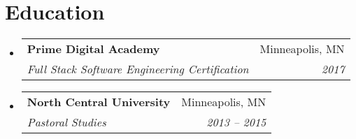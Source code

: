 \documentclass[letterpaper,12pt]{article}
\makeatletter
\newcommand{\resumeSubheading}[4]{
  \vspace{-2pt}\item
    \begin{tabular*}{0.97\textwidth}[t]{l@{\extracolsep{\fill}}r}
      \textbf{#1} & #2 \\
      \textit{\small#3} & \textit{\small #4} \\
    \end{tabular*}\vspace{-7pt}
}
\newcommand{\resumeSubHeadingListStart}{\begin{itemize}[leftmargin=0.15in, label={}]}
\newcommand{\resumeSubHeadingListEnd}{\end{itemize}}
\makeatother
\begin{document}
\section{Education}
  \resumeSubHeadingListStart
    \resumeSubheading
      {Prime Digital Academy}{Minneapolis, MN}
      {Full Stack Software Engineering Certification}{2017}
    \resumeSubheading
      {North Central University}{Minneapolis, MN}
      {Pastoral Studies}{2013 – 2015}
  \resumeSubHeadingListEnd


\end{document}
